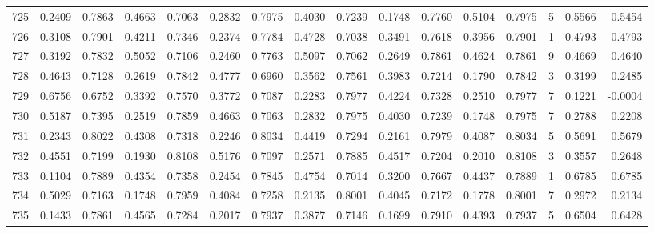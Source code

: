\begin{tabular}{lrrrrrrrrrrrrrrr}
725 &      0.2409 &  0.7863 &  0.4663 &  0.7063 &  0.2832 &  0.7975 &  0.4030 &  0.7239 &  0.1748 &  0.7760 &   0.5104 &     0.7975 &      5 &                    0.5566 &                     0.5454 \\
726 &      0.3108 &  0.7901 &  0.4211 &  0.7346 &  0.2374 &  0.7784 &  0.4728 &  0.7038 &  0.3491 &  0.7618 &   0.3956 &     0.7901 &      1 &                    0.4793 &                     0.4793 \\
727 &      0.3192 &  0.7832 &  0.5052 &  0.7106 &  0.2460 &  0.7763 &  0.5097 &  0.7062 &  0.2649 &  0.7861 &   0.4624 &     0.7861 &      9 &                    0.4669 &                     0.4640 \\
728 &      0.4643 &  0.7128 &  0.2619 &  0.7842 &  0.4777 &  0.6960 &  0.3562 &  0.7561 &  0.3983 &  0.7214 &   0.1790 &     0.7842 &      3 &                    0.3199 &                     0.2485 \\
729 &      0.6756 &  0.6752 &  0.3392 &  0.7570 &  0.3772 &  0.7087 &  0.2283 &  0.7977 &  0.4224 &  0.7328 &   0.2510 &     0.7977 &      7 &                    0.1221 &                    -0.0004 \\
730 &      0.5187 &  0.7395 &  0.2519 &  0.7859 &  0.4663 &  0.7063 &  0.2832 &  0.7975 &  0.4030 &  0.7239 &   0.1748 &     0.7975 &      7 &                    0.2788 &                     0.2208 \\
731 &      0.2343 &  0.8022 &  0.4308 &  0.7318 &  0.2246 &  0.8034 &  0.4419 &  0.7294 &  0.2161 &  0.7979 &   0.4087 &     0.8034 &      5 &                    0.5691 &                     0.5679 \\
732 &      0.4551 &  0.7199 &  0.1930 &  0.8108 &  0.5176 &  0.7097 &  0.2571 &  0.7885 &  0.4517 &  0.7204 &   0.2010 &     0.8108 &      3 &                    0.3557 &                     0.2648 \\
733 &      0.1104 &  0.7889 &  0.4354 &  0.7358 &  0.2454 &  0.7845 &  0.4754 &  0.7014 &  0.3200 &  0.7667 &   0.4437 &     0.7889 &      1 &                    0.6785 &                     0.6785 \\
734 &      0.5029 &  0.7163 &  0.1748 &  0.7959 &  0.4084 &  0.7258 &  0.2135 &  0.8001 &  0.4045 &  0.7172 &   0.1778 &     0.8001 &      7 &                    0.2972 &                     0.2134 \\
735 &      0.1433 &  0.7861 &  0.4565 &  0.7284 &  0.2017 &  0.7937 &  0.3877 &  0.7146 &  0.1699 &  0.7910 &   0.4393 &     0.7937 &      5 &                    0.6504 &                     0.6428 \\

\end{tabular}
